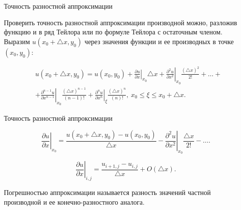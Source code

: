 \documentclass[10pt,xcolor=pst,aspectratio=169]{beamer}
\begin{document}
\begin{frame}{Точность разностной аппроксимации}

    \transdissolve[duration=0.1]
    \justifying
    \large

    Проверить точность разностной аппроксимации производной можно, разложив функцию и в ряд Тейлора или по формуле Тейлора с остаточным членом. Выразим $u \left( x_{0} + \triangle x, y_{0} \right)$ через значения функции и ее производных в точке $\left( x_{0}, y_{0} \right)$:

    \[
        \begin{split}
            &u \left( x_{0} + \triangle x, y_{0} \right) = u \left( x_{0}, y_{0} \right) + \boxed{\left. \frac{\partial u}{\partial x} \right|_{x_{0}} \triangle x} + \left. \frac{\partial^{2} u}{\partial x^{2}} \right|_{x_{0}} \frac{\left( \triangle x \right)^{2}}{2!} + \ldots + \\
            &+ \left. \frac{\partial^{n-1} u}{\partial x^{n-1}} \right|_{x_{0}} \frac{\left( \triangle x \right)^{n-1}}{\left( n - 1 \right)!} + \left. \frac{\partial^{n} u}{ \partial x^{n}} \right|_{\xi} \frac{\left( \triangle x \right)^{n}}{\left( n \right)!}, \: x_{0} \leq \xi \leq x_{0} + \triangle x.
        \end{split}
    \]

\end{frame}

\begin{frame}{Точность разностной аппроксимации}

    \transdissolve[duration=0.1]
    \justifying
    \large

    \[
        \left. \frac{\partial u}{\partial x} \right|_{x_{0}} = \frac{u \left( x_{0} + \triangle x, y_{0} \right) - u \left( x_{0}, y_{0} \right)}{\triangle x} - \left. \frac{\partial^{2} u}{\partial x^{2}} \right|_{x_{0}} \frac{\triangle x}{2!} - \ldots.
    \]

    \[
        \left. \frac{\partial u}{\partial x} \right|_{i, j} = \frac{u_{i + 1, j} - u_{i, j}}{\triangle x} + \mathit{O} \left( \triangle x \right).
    \]

    Погрешностью аппроксимации называется разность значений частной производной и ее конечно-разностного аналога.

\end{frame}
\end{document}
